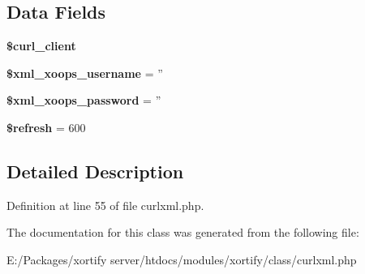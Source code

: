 \subsection*{Data Fields}
\begin{DoxyCompactItemize}
\item 
\hypertarget{class_c_u_r_l_x_m_l_xortify_exchange_a402f2112991f3227835af80e9df33e38}{{\bfseries \$curl\-\_\-client}}\label{class_c_u_r_l_x_m_l_xortify_exchange_a402f2112991f3227835af80e9df33e38}

\item 
\hypertarget{class_c_u_r_l_x_m_l_xortify_exchange_a725df0dd6b578e15522ed15945e5901c}{{\bfseries \$xml\-\_\-xoops\-\_\-username} = ''}\label{class_c_u_r_l_x_m_l_xortify_exchange_a725df0dd6b578e15522ed15945e5901c}

\item 
\hypertarget{class_c_u_r_l_x_m_l_xortify_exchange_a8ec2889165c837354fded1cedbd42157}{{\bfseries \$xml\-\_\-xoops\-\_\-password} = ''}\label{class_c_u_r_l_x_m_l_xortify_exchange_a8ec2889165c837354fded1cedbd42157}

\item 
\hypertarget{class_c_u_r_l_x_m_l_xortify_exchange_a8527f826b6959aaa92b0e51ee427ba1a}{{\bfseries \$refresh} = 600}\label{class_c_u_r_l_x_m_l_xortify_exchange_a8527f826b6959aaa92b0e51ee427ba1a}

\end{DoxyCompactItemize}


\subsection{Detailed Description}


Definition at line 55 of file curlxml.\-php.



The documentation for this class was generated from the following file\-:\begin{DoxyCompactItemize}
\item 
E\-:/\-Packages/xortify server/htdocs/modules/xortify/class/curlxml.\-php\end{DoxyCompactItemize}
